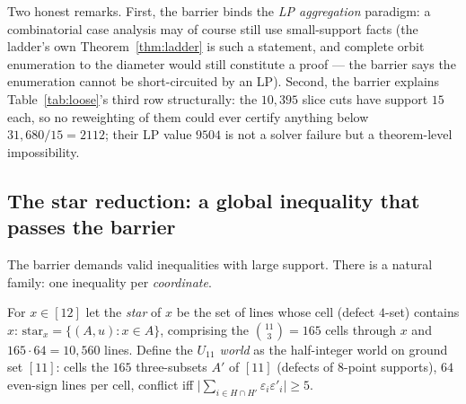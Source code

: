 \documentclass[11pt]{article}
\theoremstyle{remark}
\begin{document}
Two honest remarks. First, the barrier binds the \emph{LP aggregation}
paradigm: a combinatorial case analysis may of course still use
small-support facts (the ladder's own Theorem~\ref{thm:ladder} is such a
statement, and complete orbit enumeration to the diameter would still
constitute a proof --- the barrier says the enumeration cannot be
short-circuited by an LP). Second, the barrier explains
Table~\ref{tab:loose}'s third row structurally: the $10{,}395$ slice cuts
have support $15$ each, so no reweighting of them could ever certify
anything below $31{,}680/15=2112$; their LP value $9504$ is not a solver
failure but a theorem-level impossibility.

\subsection{The star reduction: a global inequality that passes the
barrier}\label{sec:star}

The barrier demands valid inequalities with large support. There is a
natural family: one inequality per \emph{coordinate}.

For $x\in[12]$ let the \emph{star} of $x$ be the set of lines whose cell
(defect $4$-set) contains $x$: $\mathrm{star}_x=\{(A,u):x\in A\}$,
comprising the $\binom{11}3=165$ cells through $x$ and
$165\cdot64=10{,}560$ lines. Define the \emph{$U_{11}$ world} as the
half-integer world on ground set $[11]$: cells the $165$ three-subsets
$A'$ of $[11]$ (defects of $8$-point supports), $64$ even-sign lines per
cell, conflict iff $\bigl|\sum_{i\in H\cap H'}\varepsilon_i
\varepsilon'_i\bigr|\ge5$.
\end{document}
